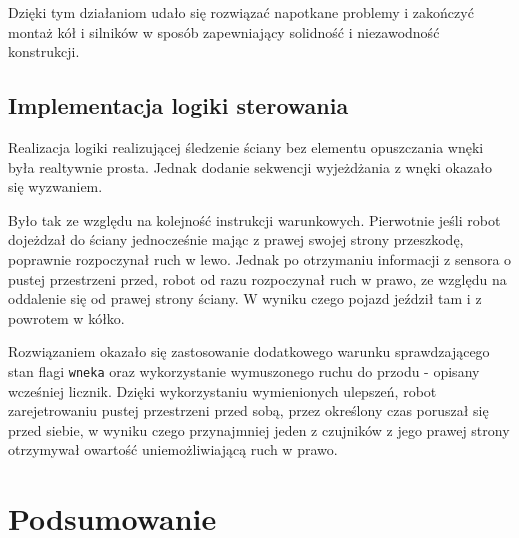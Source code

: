 \documentclass{report}
\begin{document}
Dzięki tym działaniom udało się rozwiązać napotkane problemy i zakończyć montaż kół i silników w sposób zapewniający solidność i niezawodność konstrukcji.

\subsection{\Large Implementacja logiki sterowania}
Realizacja logiki realizującej śledzenie ściany bez elementu opuszczania wnęki była realtywnie prosta. Jednak dodanie sekwencji wyjeżdżania z wnęki okazało się wyzwaniem.

Było tak ze względu na kolejność instrukcji warunkowych. Pierwotnie jeśli robot dojeżdzał do ściany jednocześnie mając z prawej swojej strony przeszkodę, poprawnie rozpoczynał ruch w lewo. Jednak po otrzymaniu informacji z sensora o pustej przestrzeni przed, robot od razu rozpoczynał ruch w prawo, ze względu na oddalenie się od prawej strony ściany. W wyniku czego pojazd jeździł tam i z powrotem w kółko. 

Rozwiązaniem okazało się zastosowanie dodatkowego warunku sprawdzającego stan flagi \texttt{wneka} oraz wykorzystanie wymuszonego ruchu do przodu - opisany wcześniej licznik. Dzięki wykorzystaniu wymienionych ulepszeń, robot zarejetrowaniu pustej przestrzeni przed sobą, przez określony czas poruszał się przed siebie, w wyniku czego przynajmniej jeden z czujników z jego prawej strony otrzymywał owartość uniemożliwiającą ruch w prawo. 


\section{\LARGE Podsumowanie}
%
%
\end{document}
